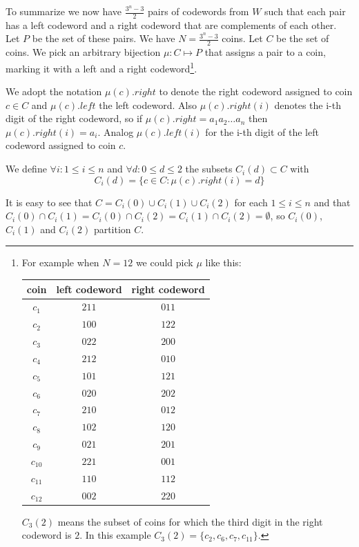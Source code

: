 To summarize we now have $\frac{3^n - 3}{2}$ pairs of codewords from $W$ such that each pair has a left codeword and a right codeword that are complements of each other. Let $P$ be the set of these pairs. We have $N=\frac{3^n - 3}{2}$ coins. Let $C$ be the set of coins. We pick an arbitrary bijection $\mu: C \mapsto P$ that assigns a pair to a coin, marking it with a left and a right codeword\footnote{For example when $N=12$ we could pick $\mu$ like this:
\begin{center}
\begin{tabular}{ |c|c|c| } 
 \hline
 coin & left codeword & right codeword \\
 \hline
 $c_1$ & $211$ & $011$ \\
 $c_2$ & $100$ & $122$ \\  
 $c_3$ & $022$ & $200$ \\
 $c_4$ & $212$ & $010$ \\
 $c_5$ & $101$ & $121$ \\
 $c_6$ & $020$ & $202$ \\
 $c_7$ & $210$ & $012$ \\
 $c_8$ & $102$ & $120$ \\
 $c_9$ & $021$ & $201$ \\
 $c_{10}$ & $221$ & $001$ \\
 $c_{11}$ & $110$ & $112$ \\
 $c_{12}$ & $002$ & $220$ \\
 \hline
\end{tabular}
\end{center}
$C_3(2)$ means the subset of coins for which the third digit in the right codeword is $2$. In this example $C_3(2) = \{c_2, c_6, c_7, c_{11}\}$.}.

 We adopt the notation $\mu(c).right$ to denote the right codeword assigned to coin $c \in C$ and $\mu(c).left$ the left codeword. Also $\mu(c).right(i)$ denotes the i-th digit of the right codeword, so if $\mu(c).right = a_1 a_2 \ldots a_n$ then $\mu(c).right(i) = a_i$. Analog $\mu(c).left(i)$ for the i-th digit of the left codeword assigned to coin $c$. 

We define $\forall i: 1 \leq i \leq n$ and $\forall d: 0 \leq d \leq 2$ the subsets $C_i(d) \subset C$  with 
$$
C_i(d) = \{ c \in C: \mu(c).right(i) = d\}
$$

It is easy to see that $C = C_i(0) \cup C_i(1) \cup C_i(2)$ for each $1 \leq i \leq n$ and that $C_i(0) \cap C_i(1) = C_i(0) \cap C_i(2) = C_i(1) \cap C_i(2) =\emptyset$, so $C_i(0)$, $C_i(1)$ and $C_i(2)$ partition $C$.

